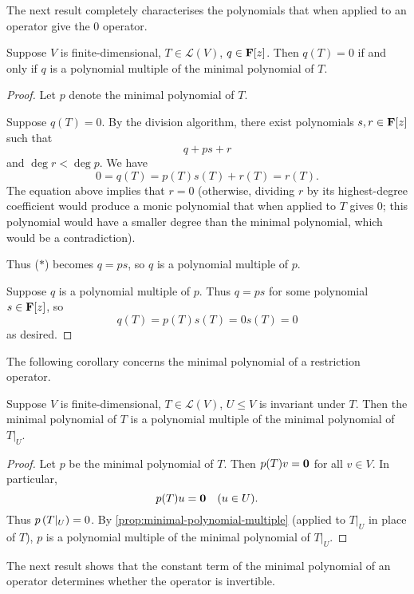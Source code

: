 The next result completely characterises the polynomials that when applied to an operator give the $0$ operator.

\begin{proposition}\label{prop:minimal-polynomial-multiple}
Suppose $V$ is finite-dimensional, $T\in\mathcal{L}(V)$, $q\in\mathbf F[z]$. Then $q(T)=0$ if and only if $q$ is a polynomial multiple of the minimal polynomial of $T$.
\end{proposition}

\begin{proof}
Let $p$ denote the minimal polynomial of $T$.

\forward Suppose $q(T)=0$. By the division algorithm, there exist polynomials $s,r\in\mathbf F[z]$ such that
\begin{equation*}\tag{$\ast$}
q+ps+r
\end{equation*}
and $\deg r<\deg p$. We have
\[0=q(T)=p(T)s(T)+r(T)=r(T).\]
The equation above implies that $r=0$ (otherwise, dividing $r$ by its highest-degree coefficient would produce a monic polynomial that when applied to $T$ gives $0$; this polynomial would have a smaller degree than the minimal polynomial, which would be a contradiction). 

Thus ($\ast$) becomes $q=ps$, so $q$ is a polynomial multiple of $p$.

\backward Suppose $q$ is a polynomial multiple of $p$. Thus $q=ps$ for some polynomial $s\in\mathbf F[z]$, so
\[q(T)=p(T)s(T)=0s(T)=0\]
as desired.
\end{proof}

The following corollary concerns the minimal polynomial of a restriction operator.

\begin{corollary}\label{cor:restriction-operator-minimal-polynomial-multiple}
Suppose $V$ is finite-dimensional, $T\in\mathcal{L}(V)$, $U\le V$ is invariant under $T$. Then the minimal polynomial of $T$ is a polynomial multiple of the minimal polynomial of $T|_U$.
\end{corollary}

\begin{proof}
Let $p$ be the minimal polynomial of $T$. Then $p(T)v=\vb{0}$ for all $v\in V$. In particular,
\[p(T)u=\vb{0}\quad(u\in U).\]
Thus $p\left(T|_U\right)=0$. By \ref{prop:minimal-polynomial-multiple} (applied to $T|_U$ in place of $T$), $p$ is a polynomial multiple of the minimal polynomial of $T|_U$.
\end{proof}

The next result shows that the constant term of the minimal polynomial of an operator determines whether the operator is invertible.

